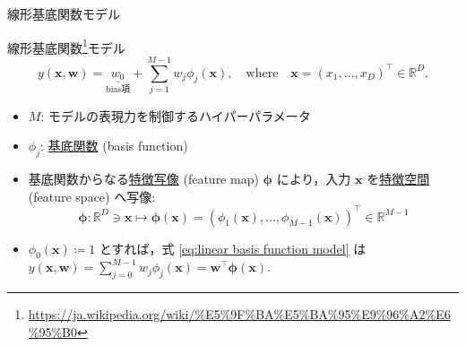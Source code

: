\documentclass[uplatex,11pt,dvipdfmx,aspectratio=169,unicode,t]{beamer}
\numberwithin{equation}{section}
\newcommand{\BR}{\mathbb{R}}
\newcommand{\bs}[1]{\boldsymbol{#1}}
\newcommand{\1}{\bs{1}}
\newcommand{\0}{\bs{0}}
\begin{document}
\begin{frame}{線形基底関数モデル}
    \begin{itembox}[c]{線形基底関数\footnote{\url{https://ja.wikipedia.org/wiki/\%E5\%9F\%BA\%E5\%BA\%95\%E9\%96\%A2\%E6\%95\%B0}}モデル}
        \vspace{-11pt}
        \begin{equation} \label{eq:linear basis function model}
            y(\bs{x},\bs{w}) = \underset{\text{bias項}}{\underline{w_{0}}} + \sum_{j=1}^{M-1} w_{j}\phi_{j}(\bs{x}), \quad \text{where} \quad \bs{x} = (x_{1},\ldots,x_{D})^{\top} \in \BR^{D}.
        \end{equation}
        \vspace{-11pt}
        \begin{itemize}
            \item $M$: モデルの表現力を制御するハイパーパラメータ
            \item $\phi_{j}$: \underline{基底関数} (basis function)
            \item 基底関数からなる\underline{特徴写像} (feature map) $\bs{\phi}$ により，入力 $\bs{x}$ を\underline{特徴空間} (feature space) へ写像:
            \vspace{-5.5pt}
            \begin{equation}
                \bs{\phi} \colon \BR^{D} \ni \bs{x} \longmapsto \bs{\phi}(\bs{x}) = (\phi_{1}(\bs{x}),\ldots,\phi_{M-1}(\bs{x}))^{\top} \in \BR^{M-1}
            \end{equation}
        \end{itemize}
    \end{itembox}
    \begin{itemize}
        \vspace{-22pt}
        \item $\phi_{0}(\bs{x}) \coloneqq 1$ とすれば，式 \eqref{eq:linear basis function model} は $y(\bs{x},\bs{w}) = \sum_{j=0}^{M-1} w_{j}\phi_{j}(\bs{x}) = \bs{w}^{\top}\bs{\phi}(\bs{x})$.
    \end{itemize}
\end{frame}
\end{document}
